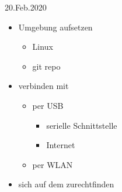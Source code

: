 \documentclass{beamer}
\begin{document}
\begin{frame}{20.Feb.2020}
\begin{itemize}
 \item Umgebung aufsetzen
 \begin{itemize}
  \item Linux
  \item git repo
 \end{itemize}
\item \target verbinden mit \host
 \begin{itemize}
  \item per USB
  \begin{itemize}
   \item serielle Schnittstelle 
   \item Internet
  \end{itemize}
  \item per WLAN
 \end{itemize}
\item sich auf dem \target zurechtfinden
\end{itemize}
\end{frame}
\end{document}
